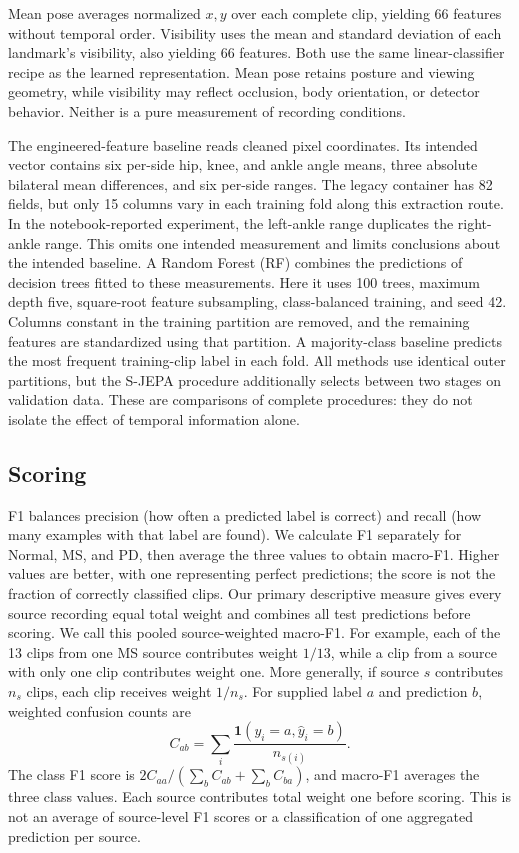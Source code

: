 \documentclass[10pt,twocolumn,letterpaper]{article}
\begin{document}
Mean pose averages normalized $x,y$ over each complete clip, yielding 66 features without temporal order. Visibility uses the mean and standard deviation of each landmark's visibility, also yielding 66 features. Both use the same linear-classifier recipe as the learned representation. Mean pose retains posture and viewing geometry, while visibility may reflect occlusion, body orientation, or detector behavior. Neither is a pure measurement of recording conditions.

The engineered-feature baseline reads cleaned pixel coordinates. Its intended vector contains six per-side hip, knee, and ankle angle means, three absolute bilateral mean differences, and six per-side ranges. The legacy container has 82 fields, but only 15 columns vary in each training fold along this extraction route. In the notebook-reported experiment, the left-ankle range duplicates the right-ankle range. This omits one intended measurement and limits conclusions about the intended baseline. A Random Forest (RF) combines the predictions of decision trees fitted to these measurements. Here it uses 100 trees, maximum depth five, square-root feature subsampling, class-balanced training, and seed 42. Columns constant in the training partition are removed, and the remaining features are standardized using that partition. A majority-class baseline predicts the most frequent training-clip label in each fold. All methods use identical outer partitions, but the S-JEPA procedure additionally selects between two stages on validation data. These are comparisons of complete procedures: they do not isolate the effect of temporal information alone.

\subsection{Scoring}
F1 balances precision (how often a predicted label is correct) and recall (how many examples with that label are found). We calculate F1 separately for Normal, MS, and PD, then average the three values to obtain macro-F1. Higher values are better, with one representing perfect predictions; the score is not the fraction of correctly classified clips. Our primary descriptive measure gives every source recording equal total weight and combines all test predictions before scoring. We call this pooled source-weighted macro-F1. For example, each of the 13 clips from one MS source contributes weight $1/13$, while a clip from a source with only one clip contributes weight one. More generally, if source $s$ contributes $n_s$ clips, each clip receives weight $1/n_s$. For supplied label $a$ and prediction $b$, weighted confusion counts are
\begin{equation}
C_{ab}=\sum_i \frac{\mathbf{1}(y_i=a,\widehat{y}_i=b)}{n_{s(i)}}.
\end{equation}
The class F1 score is $2C_{aa}/(\sum_b C_{ab}+\sum_b C_{ba})$, and macro-F1 averages the three class values. Each source contributes total weight one before scoring. This is not an average of source-level F1 scores or a classification of one aggregated prediction per source.
\end{document}
